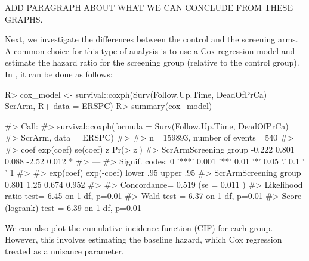 \documentclass[
]{jss}
\begin{document}
ADD PARAGRAPH ABOUT WHAT WE CAN CONCLUDE FROM THESE GRAPHS.

Next, we investigate the differences between the control and the
screening arms. A common choice for this type of analysis is to use a
Cox regression model and estimate the hazard ratio for the screening
group (relative to the control group). In , it can be done
as follows:

\begin{CodeChunk}

\begin{CodeInput}
R> cox_model <- survival::coxph(Surv(Follow.Up.Time, DeadOfPrCa) ~ ScrArm, 
R+                              data = ERSPC)
R> summary(cox_model)
\end{CodeInput}

\begin{CodeOutput}
#> Call:
#> survival::coxph(formula = Surv(Follow.Up.Time, DeadOfPrCa) ~ 
#>     ScrArm, data = ERSPC)
#> 
#>   n= 159893, number of events= 540 
#> 
#>                         coef exp(coef) se(coef)     z Pr(>|z|)  
#> ScrArmScreening group -0.222     0.801    0.088 -2.52    0.012 *
#> ---
#> Signif. codes:  0 '***' 0.001 '**' 0.01 '*' 0.05 '.' 0.1 ' ' 1
#> 
#>                       exp(coef) exp(-coef) lower .95 upper .95
#> ScrArmScreening group     0.801       1.25     0.674     0.952
#> 
#> Concordance= 0.519  (se = 0.011 )
#> Likelihood ratio test= 6.45  on 1 df,   p=0.01
#> Wald test            = 6.37  on 1 df,   p=0.01
#> Score (logrank) test = 6.39  on 1 df,   p=0.01
\end{CodeOutput}
\end{CodeChunk}

We can also plot the cumulative incidence function (CIF) for each group.
However, this involves estimating the baseline hazard, which Cox
regression treated as a nuisance parameter.
\end{document}
